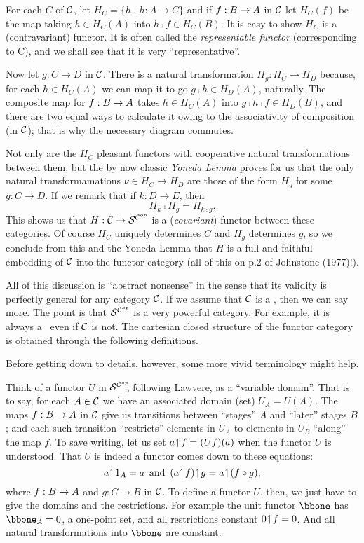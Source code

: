 For each $C$ of $\mathcal C$, let $H_C = \{ h \mid h: A \to C \}$ and if $f: B \rightarrow A$ in $\mathcal C$ let $H_C(f)$ be the map taking $h \in H_C(A)$ into $h \comp f \in H_C(B)$.
It is easy to show $H_C$ is a (contravariant) functor. It is often called the {\it representable functor} (corresponding to C), and we shall see that it is very ``representative''.

Now let $g: C \to D$ in $\mathcal C$. There is a natural transformation
$H_g: H_C \to H_D$ because, for each $h \in H_C(A)$ we can map it to go $g \comp h \in H_D(A)$, naturally. The composite map for $f : B \rightarrow A$
takes $h \in H_C(A)$ into $g \comp h \comp f \in H_D(B)$, and there are two equal
ways to calculate it owing to the associativity of composition (in $\mathcal C$); that is why the necessary diagram commutes.

Not only are the $H_C$ pleasant functors with cooperative natural transformations between them, but the by now classic {\it Yoneda Lemma}
proves for us that the only natural transformamations $\nu \in H_C \to H_D$
are those of the form $H_g$ for some $g: C\to D$. If we remark that if $k:D\to E$, then
\[
H_k \comp H_g = H_{k \comp g}.
\]
%
This shows us that $H : \mathcal C \rightarrow \mathcal S^{\mathcal C^{op}}$ is a ({\it covariant}) functor between these categories.
Of course $H_C$ uniquely determines $C$ and
$H_g$ determines $g$, so we conclude from this and the Yoneda Lemma that $H$ is a full and faithful embedding of $\mathcal C$ into the functor
category (all of this on p.2 of Johnstone (1977)!).

All of this discussion is ``abstract nonsense'' in the sense that its validity is perfectly general for any category $\mathcal C$. If we assume that $\mathcal C$ is a \ccc, then we can say more. The point is that $\mathcal S^{\mathcal C^{op}}$ is a very powerful category. For example, it is
always a \ccc\  even if $\mathcal C$ is not. The cartesian closed structure of the functor category is obtained through the following definitions.

Before getting down to details, however, some more vivid terminology might help.

Think of a functor $U$ in $\mathcal S^{\mathcal C^{op}}\!\!$, following Lawvere, as a ``variable domain''.  That is to say, for each $A \in \mathcal C$ we have an associated domain (set) $U_A = U(A)$. The maps $f:B \rightarrow A$ in $\mathcal C$ give us transitions between ``stages'' $A$ and ``later'' stages $B$; and each such transition ``restricts'' elements in
$U_A$ to elements in $U_B$ ``along'' the map $f$. To save writing, let us set $a \!\upharpoonleft\! f = (Uf)(a)$ when the functor $U$ is understood. That $U$ is indeed a functor comes down to these equations:
$$
a \res \id_A = a \,\textrm{ and }\, (a \res f) \res g = a \res (f \comp g),
$$
where  $f : B \rightarrow A$ and $g: C\to B$ in $\mathcal C$. To define a functor $U$, then, we just have to give the domains and the restrictions.
For example the unit functor $\bbone$ has $\bbone_A = {0}$, a one-point set, and all restrictions constant $0 \!\upharpoonleft\! f = 0$. And all natural transformations into $\bbone$ are constant.


